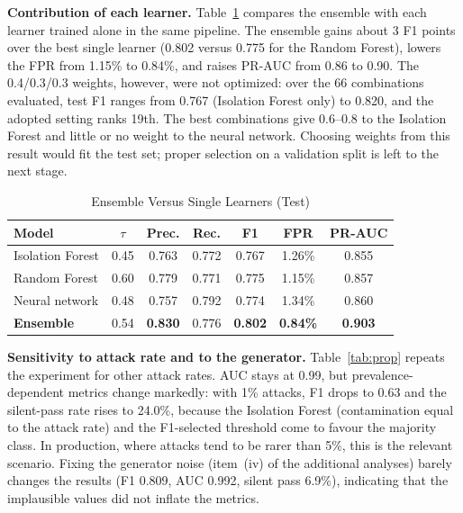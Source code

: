 \documentclass[conference]{IEEEtran}
\begin{document}
\textbf{Contribution of each learner.} Table~\ref{tab:single} compares the
ensemble with each learner trained alone in the same pipeline. The
ensemble gains about 3 F1 points over the best single learner (0.802
versus 0.775 for the Random Forest), lowers the FPR from 1.15\% to 0.84\%,
and raises PR-AUC from 0.86 to 0.90. The 0.4/0.3/0.3 weights, however,
were not optimized: over the 66 combinations evaluated, test F1 ranges
from 0.767 (Isolation Forest only) to 0.820, and the adopted setting
ranks 19th. The best combinations give 0.6--0.8 to the Isolation Forest
and little or no weight to the neural network. Choosing weights from this
result would fit the test set; proper selection on a validation split is
left to the next stage.

\begin{table}[t]
\caption{Ensemble Versus Single Learners (Test)}
\label{tab:single}
\centering
\footnotesize
\setlength{\tabcolsep}{4pt}
\renewcommand{\arraystretch}{1.15}
\begin{tabular}{@{}lcccccc@{}}
\toprule
\textbf{Model} & $\tau$ & \textbf{Prec.} & \textbf{Rec.} & \textbf{F1} & \textbf{FPR} & \textbf{PR-AUC} \\
\midrule
Isolation Forest & 0.45 & 0.763 & 0.772 & 0.767 & 1.26\% & 0.855 \\
Random Forest    & 0.60 & 0.779 & 0.771 & 0.775 & 1.15\% & 0.857 \\
Neural network   & 0.48 & 0.757 & 0.792 & 0.774 & 1.34\% & 0.860 \\
\textbf{Ensemble} & 0.54 & \textbf{0.830} & 0.776 & \textbf{0.802} & \textbf{0.84\%} & \textbf{0.903} \\
\bottomrule
\end{tabular}
\end{table}

\textbf{Sensitivity to attack rate and to the generator.}
Table~\ref{tab:prop} repeats the experiment for other attack rates. AUC
stays at 0.99, but prevalence-dependent metrics change markedly: with 1\%
attacks, F1 drops to 0.63 and the silent-pass rate rises to 24.0\%,
because the Isolation Forest (contamination equal to the attack rate) and
the F1-selected threshold come to favour the majority class. In
production, where attacks tend to be rarer than 5\%, this is the relevant
scenario. Fixing the generator noise (item~(iv) of the additional
analyses) barely changes the results (F1 0.809, AUC 0.992, silent pass
6.9\%), indicating that the implausible values did not inflate the
metrics.
\end{document}
